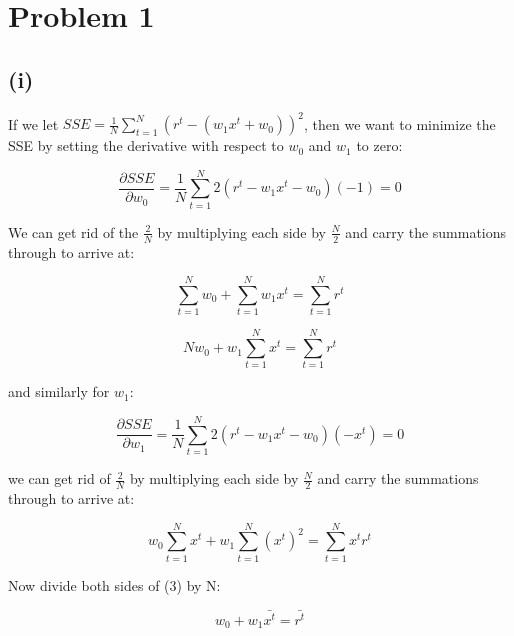 \documentclass{article}
\begin{document}
\section{Problem 1}

\subsection{(i)}

If we let $SSE = \frac{1}{N} \sum\limits_{t = 1}^N (r^t - (w_1x^t + w_0))^2$, then we want to minimize the SSE by setting the derivative with respect to $w_0$ and $w_1$ to zero:

\begin{equation}
\frac {\partial SSE}{\partial w_0} = \frac{1}{N} \sum\limits_{t = 1}^N 2(r^t - w_1 x^t - w_0)(-1) = 0
\end{equation}

We can get rid of the $\frac{2}{N}$ by multiplying each side by $\frac{N}{2}$ and carry the summations through to arrive at:

\begin{equation}
\sum\limits_{t = 1}^N w_0 + \sum\limits_{t = 1}^N w_1 x^t = \sum\limits_{t = 1}^N r^t
\end{equation}

\begin{equation}
N w_0 + w_1 \sum\limits_{t = 1}^N x^t = \sum\limits_{t = 1}^N r^t
\end{equation}

and similarly for $w_1$:

\begin{equation}
\frac {\partial SSE}{\partial w_1} = \frac{1}{N} \sum\limits_{t = 1}^N 2(r^t - w_1 x^t - w_0)(-x^t) = 0
\end{equation}

we can get rid of $\frac{2}{N}$ by multiplying each side by $\frac{N}{2}$ and carry the summations through to arrive at:

\begin{equation}
w_0 \sum\limits_{t = 1}^N x^t + w_1 \sum\limits_{t = 1}^N (x^t)^2 = \sum\limits_{t = 1}^N x^t r^t
\end{equation}

Now divide both sides of (3) by N:

\begin{equation}
w_0 + w_1 \bar{x^t} = \bar{r^t}
\end{equation}
\end{document}
